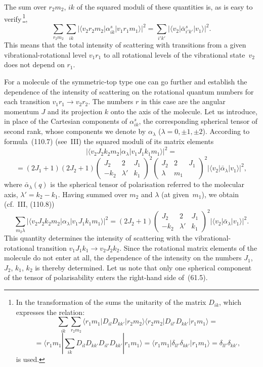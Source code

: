 The sum over $r_2 m_2$, $ik$ of the squared moduli of these quantities is, as is easy to verify\,\footnote{In the transformation of the sums the unitarity of the matrix $D_{ik}$, which expresses the relation:
\[
\sum_{ik}\sum_{r_2m_2}\langle r_1m_1|D_{il}D_{kk'}|r_2m_2\rangle\langle r_2m_2|D_{il'}D_{kk'}|r_1m_1\rangle =
\]
\[
{}= \langle r_1m_1|\sum_{ik}D_{il}D_{kk'}D_{il'}D_{kk'}|r_1m_1\rangle = \langle r_1m_1|\delta_{ll'}\delta_{kk'}|r_1m_1\rangle = \delta_{ll'}\delta_{kk'},
\]
is used.},
\begin{equation}
\sum_{r_2m_2}\sum_{ik}|\langle v_2 r_2 m_2|\alpha^s_{ik}|v_1 r_1 m_1\rangle|^2 = \sum_{i'k'}|\langle v_2|\bar{\alpha}^s_{i'k'}|v_1\rangle|^2.
\tag{61.4}
\end{equation}
This means that the total intensity of scattering with transitions from a given vibrational-rotational level $v_1 r_1$ to all rotational levels of the vibrational state~$v_2$ does not depend on $r_1$.

For a molecule of the symmetric-top type one can go further and establish the dependence of the intensity of scattering on the rotational quantum numbers for each transition $v_1 r_1 \to v_2 r_2$. The numbers $r$ in this case are the angular momentum $J$ and its projection $k$ onto the axis of the molecule. Let us introduce, in place of the Cartesian components of $\alpha^s_{ik}$, the corresponding spherical tensor of second rank, whose components we denote by $\alpha_\lambda$ ($\lambda = 0, \pm 1, \pm 2$). According to formula~(110.7) (see~III) the squared moduli of its matrix elements
\[
|\langle v_2 J_2 k_2 m_2|\alpha_\lambda|v_1 J_1 k_1 m_1\rangle|^2 =
\]
\[
{}= (2J_1+1)(2J_2+1)\begin{pmatrix}J_2 & 2 & J_1\\-k_2 & \lambda' & k_1\end{pmatrix}^{\!2}\begin{pmatrix}J_2 & 2 & J_1\\ \lambda & m_1\end{pmatrix}^{\!2}|\langle v_2|\bar{\alpha}_\lambda|v_1\rangle|^2,
\]
where $\bar{\alpha}_\lambda(q)$ is the spherical tensor of polarisation referred to the molecular axis, $\lambda' = k_2 - k_1$. Having summed over $m_2$ and $\lambda$ (at given~$m_1$), we obtain (cf.~III, (110.8))
\begin{equation}
\sum_{m_2\lambda}|\langle v_2 J_2 k_2 m_2|\alpha_\lambda|v_1 J_1 k_1 m_1\rangle|^2 = (2J_2+1)\begin{pmatrix}J_2 & 2 & J_1\\-k_2 & \lambda' & k_1\end{pmatrix}^{\!2}|\langle v_2|\bar{\alpha}_\lambda|v_1\rangle|^2.
\tag{61.5}
\end{equation}
This quantity determines the intensity of scattering with the vibrational-rotational transition $v_1 J_1 k_1 \to v_2 J_2 k_2$. Since the rotational matrix elements of the molecule do not enter at all, the dependence of the intensity on the numbers $J_1$, $J_2$, $k_1$, $k_2$ is thereby determined. Let us note that only one spherical component of the tensor of polarisability enters the right-hand side of~(61.5).

